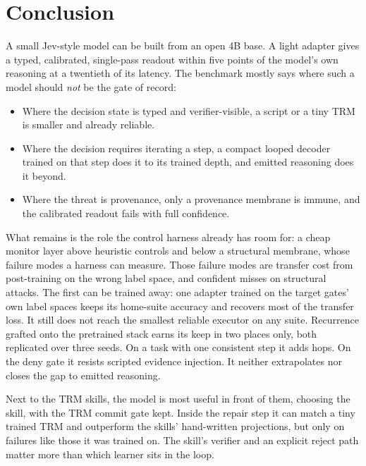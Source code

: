 \documentclass[11pt]{article}
\begin{document}
\section{Conclusion}
A small Jev-style model can be built from an open 4B base. A light adapter gives a typed,
calibrated, single-pass readout within five points of the model's own reasoning at a twentieth of
its latency. The benchmark mostly says where such a model should \emph{not} be the gate of record:
\begin{itemize}
  \item Where the decision state is typed and verifier-visible, a script or a tiny TRM is smaller
  and already reliable.
  \item Where the decision requires iterating a step, a compact looped decoder trained on that
  step does it to its trained depth, and emitted reasoning does it beyond.
  \item Where the threat is provenance, only a provenance membrane is immune, and the calibrated
  readout fails with full confidence.
\end{itemize}
What remains is the role the control harness already has room for: a cheap monitor layer above
heuristic controls and below a structural membrane, whose failure modes a harness can measure.
Those failure modes are transfer cost from post-training on the wrong label space, and confident
misses on structural attacks. The first can be trained away: one adapter trained on the target
gates' own label spaces keeps its home-suite accuracy and recovers most of the transfer loss. It
still does not reach the smallest reliable executor on any suite. Recurrence grafted onto the pretrained stack earns its keep in two
places only, both replicated over three seeds. On a task with one consistent step it adds hops.
On the deny gate it resists scripted evidence injection. It neither extrapolates nor closes the gap
to emitted reasoning.

Next to the TRM skills, the model is most useful in front of them, choosing the skill, with the
TRM commit gate kept. Inside the repair step it can match a tiny trained TRM and outperform the
skills' hand-written projections, but only on failures like those it was trained on. The skill's
verifier and an explicit reject path matter more than which learner sits in the loop.



\end{document}
